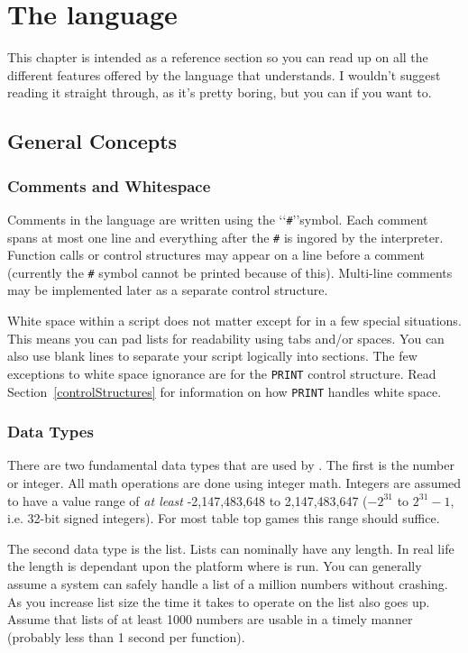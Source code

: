 
\chapter{The language}
\label{language}


This chapter is intended as a reference section so you can read up on all the
different features offered by the language that \progLogo understands. I
wouldn't suggest reading it straight through, as it's pretty boring, but you
can if you want to.

\section{General Concepts}
\label{languageConcepts}

\subsection{Comments and Whitespace}
\label{comments}
Comments in the language are written using the \lq\lq\texttt{\#}\rq\rq symbol.
Each comment spans at most one line and everything after the \texttt{\#} is
ingored by the interpreter. Function calls or control structures may
appear on a line before a comment (currently the \texttt{\#} symbol cannot be
printed because of this). Multi-line comments may be implemented later as
a separate control structure.

White space within a script does not matter except for in a few special
situations. This means you can pad lists for readability using tabs and/or spaces.
You can also use blank lines to separate your script logically into sections.
The few exceptions to white space ignorance are for the \texttt{PRINT} control
structure. Read Section~\ref{controlStructures} for information on how
\texttt{PRINT} handles white space.

\subsection{Data Types}
\label{datatypes}
There are two fundamental data types that are used by \progLogo. The first is
the number or integer. All math operations are done using integer math.
Integers are assumed to have a value range of \emph{at least}
-2,147,483,648 to 2,147,483,647 ($-2^{31}$ to $2^{31}-1$, i.e. 32-bit signed
integers). For most table top games this range should suffice.

The second data type is the list. Lists can nominally have any length. In real
life the length is dependant upon the platform where \progLogo is run. You can
generally assume a system can safely handle a list of a million numbers
without crashing. As you increase list size the time it takes to operate on the
list also goes up. Assume that lists of at least 1000 numbers are usable in a
timely manner (probably less than 1 second per function).

